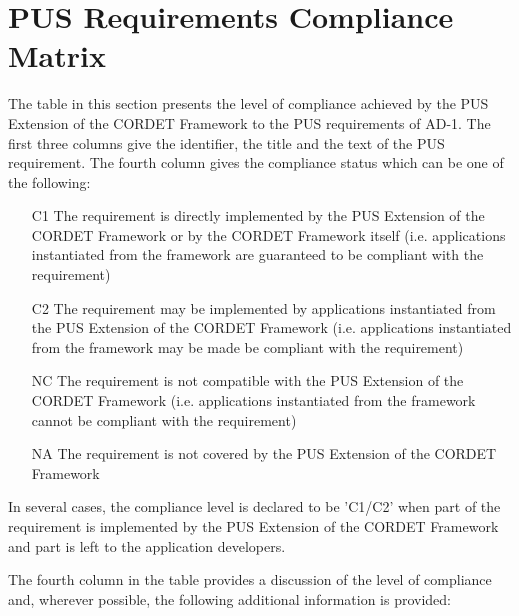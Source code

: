 \documentclass{pnp_article}
\begin{document}
\begin{landscape}


\end{landscape}



\section{PUS Requirements Compliance Matrix}\label{sec:PusReqSOC}
The table in this section presents the level of compliance achieved by the PUS Extension of the CORDET Framework to the PUS requirements of AD-1. The first three columns give the identifier, the title and the text of the PUS requirement. The fourth column gives the compliance status which can be one of the following:

\begin{itemize}
\item [C1] The requirement is directly implemented by the PUS Extension of the CORDET Framework or by the CORDET Framework itself (i.e. applications instantiated from the framework are guaranteed to be compliant with the requirement)
\item [C2] The requirement may be implemented by applications instantiated from the PUS Extension of the CORDET Framework (i.e. applications instantiated from the framework may be made be compliant with the requirement)
\item [NC] The requirement is not compatible with the PUS Extension of the CORDET Framework (i.e. applications instantiated from the framework cannot be compliant with the requirement)
\item [NA] The requirement is not covered by the PUS Extension of the CORDET Framework
\end{itemize}

In several cases, the compliance level is declared to be 'C1/C2' when part of the requirement is implemented by the PUS Extension of the CORDET Framework and part is left to the application developers.

The fourth column in the table provides a discussion of the level of compliance and, wherever possible, the following additional information is provided:
\end{document}

